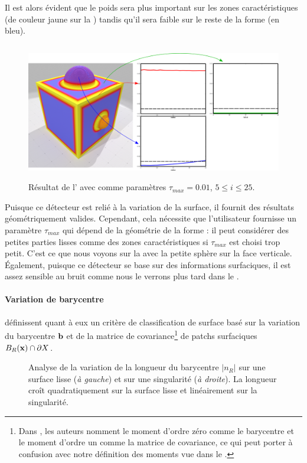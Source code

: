 %
Il est alors évident que le poids sera plus important sur les zones
caractéristiques (de couleur jaune sur la )
tandis qu'il sera faible sur le reste de la forme (en bleu).
%
\begin{figure}[ht]{
  \begin{center}
    \includegraphics[height=6cm]{figures/CubeSpherePlotPauly}
  \end{center}}
    \caption[Résultat de l']{Résultat de l' avec comme paramètres $\tau_{max} = 0.01$, $5 \le i \le 25$.
    \label{fig:pauly-cubesphere}}
\end{figure}
%
Puisque ce détecteur est relié à la variation de la surface, il fournit des
résultats géométriquement valides. Cependant, cela nécessite que l'utilisateur
fournisse un paramètre $\tau_{max}$ qui dépend de la géométrie de la forme : il
peut considérer des petites parties lisses comme des zones caractéristiques si
$\tau_{max}$ est choisi trop petit. C'est ce que nous voyons sur la
 avec la petite sphère sur la face verticale.
Également, puisque ce détecteur se base sur des informations surfaciques, il est
assez sensible au bruit comme nous le verrons plus tard dans le
.
%
\paragraph{Variation de barycentre}
%
 définissent quant à eux un critère de
classification de surface basé sur la variation du barycentre $\mathbf{b}$ et de la
matrice de covariance\footnote{Dans \cite{Telea2004}, les auteurs nomment le
moment d'ordre zéro comme le barycentre et le moment d'ordre un comme la matrice
de covariance, ce qui peut porter à confusion avec notre définition des moments
vue dans le .} de patchs surfaciques
$B_{R}(\mathbf{x}) \cap \partial X$.
%
\begin{figure}[ht]
  \begin{center}
    
  \end{center}
  \caption[Analyse de la variation de longueur du barycentre.]
  {Analyse de la variation de la longueur du barycentre $|n_R|$ sur une surface
  lisse (\emph{à gauche}) et sur une singularité (\emph{à droite}). La longueur
  croît quadratiquement sur la surface lisse et linéairement sur la
  singularité.\label{fig:moments-explained}}
\end{figure}


